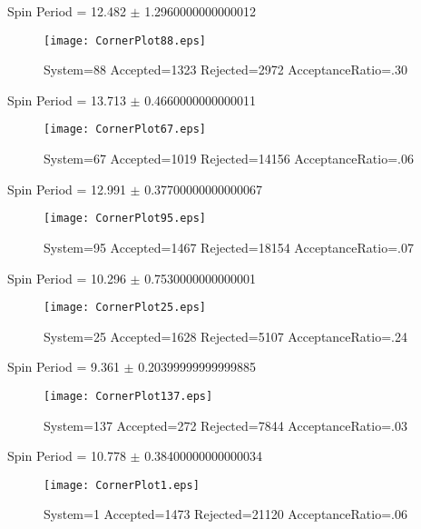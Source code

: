 \documentclass[10pt]{article}
\begin{document}
\newpage
\begin{center}
        Spin Period = 12.482 $\pm$ 1.2960000000000012
        \end{center}
\begin{figure}[h] 
        \texttt{[image: CornerPlot88.eps]}
        \caption{System=88 Accepted=1323 Rejected=2972 AcceptanceRatio=.30}
        \label{S88}
        \centering
        \end{figure}
\newpage
\begin{center}
        Spin Period = 13.713 $\pm$ 0.4660000000000011
        \end{center}
\begin{figure}[h] 
        \texttt{[image: CornerPlot67.eps]}
        \caption{System=67 Accepted=1019 Rejected=14156 AcceptanceRatio=.06}
        \label{S67}
        \centering
        \end{figure}
\newpage
\begin{center}
        Spin Period = 12.991 $\pm$ 0.37700000000000067
        \end{center}
\begin{figure}[h] 
        \texttt{[image: CornerPlot95.eps]}
        \caption{System=95 Accepted=1467 Rejected=18154 AcceptanceRatio=.07}
        \label{S95}
        \centering
        \end{figure}
\newpage
\begin{center}
        Spin Period = 10.296 $\pm$ 0.7530000000000001
        \end{center}
\begin{figure}[h] 
        \texttt{[image: CornerPlot25.eps]}
        \caption{System=25 Accepted=1628 Rejected=5107 AcceptanceRatio=.24}
        \label{S25}
        \centering
        \end{figure}
\newpage
\begin{center}
        Spin Period = 9.361 $\pm$ 0.20399999999999885
        \end{center}
\begin{figure}[h] 
        \texttt{[image: CornerPlot137.eps]}
        \caption{System=137 Accepted=272 Rejected=7844 AcceptanceRatio=.03}
        \label{S137}
        \centering
        \end{figure}
\newpage
\begin{center}
        Spin Period = 10.778 $\pm$ 0.38400000000000034
        \end{center}
\begin{figure}[h] 
        \texttt{[image: CornerPlot1.eps]}
        \caption{System=1 Accepted=1473 Rejected=21120 AcceptanceRatio=.06}
        \label{S1}
        \centering
        \end{figure}
\end{document}
